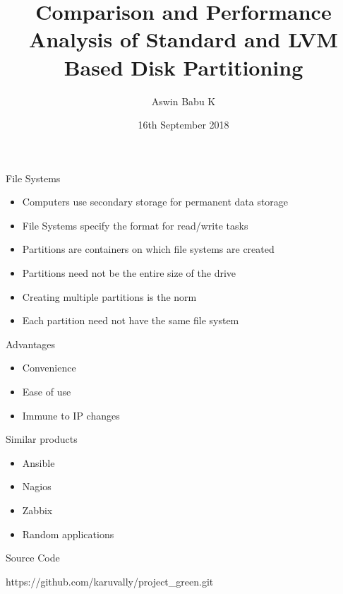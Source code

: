 \documentclass{beamer}
\title[Your Short Title]{Comparison and Performance Analysis of Standard and
LVM Based Disk Partitioning}
\author{Aswin Babu K}
\institute{College of Engineering Trivandrum}
\date{16th September 2018}
\begin{document}
\begin{frame}
    \titlepage
\end{frame}

\begin{frame}{File Systems}
    \begin{itemize}
        \item<2-> Computers use secondary storage for permanent data storage
        \item<3-> File Systems specify the format for read/write tasks
        \item<4-> Partitions are containers on which file systems are created
        \item<5-> Partitions need not be the entire size of the drive
        \item<6-> Creating multiple partitions is the norm
        \item<7-> Each partition need not have the same file system
    \end{itemize}
\end{frame}

\begin{frame}{Advantages}
    \begin{itemize}
        \item<2-> Convenience
        \item<3-> Ease of use
        \item<4-> Immune to IP changes 
    \end{itemize}
\end{frame}

\begin{frame}{Similar products}
    \begin{itemize}
        \item<2-> Ansible
        \item<3-> Nagios
        \item<4-> Zabbix
        \item<5-> Random applications
    \end{itemize}
\end{frame}

\begin{frame}{Source Code} 
    \begin{center}
        \large https://github.com/karuvally/project\_green.git
    \end{center}
\end{frame}
\end{document}
